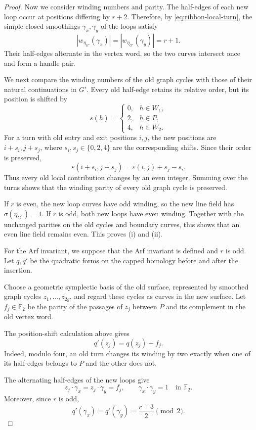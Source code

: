 \documentclass[11pt]{amsart}
\theoremstyle{definition}
\theoremstyle{plain}
\theoremstyle{definition}
\theoremstyle{definition}
\begin{document}
\begin{proof}
Now we consider winding numbers and parity.
The half-edges of each new loop occur at positions
differing by $r+2$.  Therefore, by
\eqref{eq:ribbon-local-turn}, the simple closed
smoothings $\gamma_x,\gamma_y$ of the loops satisfy
\[
  |w_{\eta_{G'}}(\gamma_x)|
  =|w_{\eta_{G'}}(\gamma_y)|=r+1.
\]
Their half-edges alternate in the vertex word, so
the two curves intersect once and form a handle pair.

We next compare the winding numbers of the old graph
cycles with those of their natural continuations in $G'$.
Every old half-edge retains its relative order, but its
position is shifted by
\[
  s(h)=
  \begin{cases}
    0,&h\in W_1,\\
    2,&h\in P,\\
    4,&h\in W_2.
  \end{cases}
\]
For a turn with old entry and exit positions $i,j$,
the new positions are $i+s_i,j+s_j$, where
$s_i,s_j\in\{0,2,4\}$ are the corresponding shifts.
Since their order is preserved,
\[
  \varepsilon(i+s_i,j+s_j)
  =\varepsilon(i,j)+s_j-s_i.
\]
Thus every old local contribution changes by an even
integer.  Summing over the turns shows that the
winding parity of every old graph cycle is preserved.

If $r$ is even, the new loop curves have odd winding,
so the new line field has $\sigma(\eta_{G'})=1$.
If $r$ is odd, both new loops have even winding.
Together with the unchanged parities on the old cycles
and boundary curves, this shows that an even line
field remains even.  This proves \textup{(i)} and
\textup{(ii)}.

For the Arf invariant, we suppose that the Arf invariant is defined and $r$ is
odd.  Let $q,q'$ be the quadratic forms on the capped
homology before and after the insertion.

Choose a geometric symplectic basis of the old surface,
represented by smoothed graph cycles $z_1,\ldots,z_{2g}$,
and regard these cycles as curves in the new surface.
Let $f_j\in\mathbb F_2$ be the parity of the passages
of $z_j$ between $P$ and its complement in the old
vertex word.

The position-shift calculation above gives
\[
  q'(z_j)=q(z_j)+f_j.
\]
Indeed, modulo four, an old turn changes its winding
by two exactly when one of its half-edges belongs to
$P$ and the other does not.

The alternating half-edges of the new loops give
\[
  z_j\cdot\gamma_x
  =z_j\cdot\gamma_y=f_j,
  \qquad
  \gamma_x\cdot\gamma_y=1
  \quad\text{in }\mathbb F_2.
\]
Moreover, since $r$ is odd,
\[
  q'(\gamma_x)=q'(\gamma_y)
  =\frac{r+3}{2}\pmod2.
\]


\end{proof}
\end{document}
